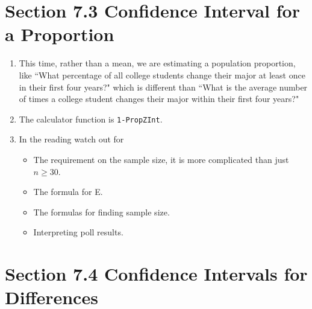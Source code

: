 \documentclass{article}
\begin{document}
\section*{Section 7.3 Confidence Interval for a Proportion}

\begin{enumerate}

    \item This time, rather than a mean, we are estimating a population proportion, like ``What percentage of all college students change their major at least once in their first four years?"  which is different than ``What is the average number of times a college student changes their major within their first four years?"
    
    \item The calculator function is \texttt{1-PropZInt}.
    
    \item In the reading watch out for
    
        \begin{itemize}
        
            \item The requirement on the sample size, it is more complicated than just $n \geq 30$.
            
            \item The formula for E.
            
            \item The formulas for finding sample size.
            
            \item Interpreting poll results.
            
        \end{itemize}
        
\end{enumerate}

\newpage

\section*{Section 7.4 Confidence Intervals for Differences}
\end{document}
